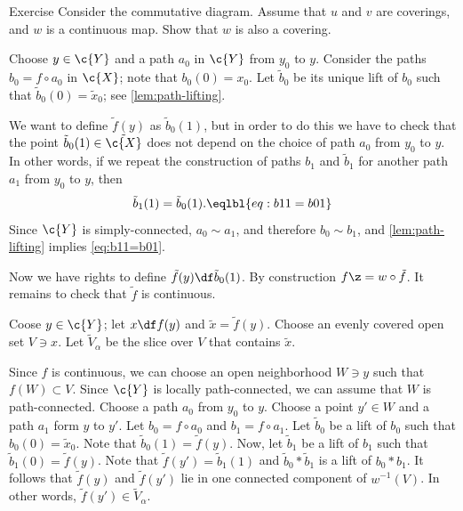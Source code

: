 {

\begin{figure}
\vskip-10mm
\centering
{}
\end{figure}

\begin{thm}{Exercise}\label{ex:lift-of-covering-is-covering}
Consider the commutative diagram.
Assume that $u$ and $v$ are coverings, and $w$ is a continuous map.
Show that $w$ is also a covering.

\end{thm}

}







Choose $y\in \c{Y}$ and a path $a_0$ in $\c{Y}$ from $y_0$ to $y$.
Consider the paths $b_0=f\circ a_0$ in $\c{X}$; note that $b_0(0)=x_0$.
Let $\tilde b_0$ be its unique lift of $b_0$ such that $\tilde b_0(0)=\tilde x_0$; see \ref{lem:path-lifting}.

We want to define $\tilde f(y)$ as $\tilde b_0(1)$, but in order to do this we have to check that the point $\tilde b_0(1)\in \tilde{\c{X}}$ does not depend on the choice of path $a_0$ from $y_0$ to $y$.
In other words, if we repeat the construction of paths $b_1$ and $\tilde b_1$ for another path $a_1$ from $y_0$ to $y$, then
\[\tilde b_1(1)=\tilde b_0(1).
\eqlbl{eq:b11=b01}\]
Since $\c{Y}$ is simply-connected, $a_0\sim a_1$, and therefore $b_0\sim b_1$, and \ref{lem:path-lifting} implies \ref{eq:b11=b01}.

Now we have rights to define $\tilde f(y)\df \tilde b_0(1)$.
By construction $f\z=w\circ \tilde f$.
It remains to check that $\tilde f$ is continuous.

Coose $y\in \c{Y}$; let $x\df f(y)$ and $\tilde x=\tilde f(y)$.
Choose an evenly covered open set $V\ni x$.
Let $\tilde V_\alpha$ be the slice over $V$ that contains $\tilde x$.

Since $f$ is continuous, we can choose an open neighborhood $W\ni y$ such that $f(W)\subset V$.
Since $\c{Y}$ is locally path-connected, we can assume that $W$ is path-connected.
Choose a path $a_0$ from $y_0$ to $y$.
Choose a point $y'\in W$ and a path $a_1$ form $y$ to $y'$.
Let $b_0=f\circ a_0$ and $b_1=f\circ a_1$.
Let $\tilde b_0$ be a lift of $b_0$ such that $b_0(0)=\tilde x_0$.
Note that $\tilde b_0(1)=\tilde f(y)$.
Now,
let $\tilde b_1$ be a lift of $b_1$ such that $\tilde b_1(0)=\tilde f(y)$.
Note that $\tilde f(y')=\tilde b_1(1)$ and $\tilde b_0*\tilde b_1$ is a lift of $b_0*b_1$.
It follows that $\tilde f(y)$ and $\tilde f(y')$ lie in one connected component of $w^{-1}(V)$.
In other words, $\tilde f(y')\in \tilde V_\alpha$.
\qeds








